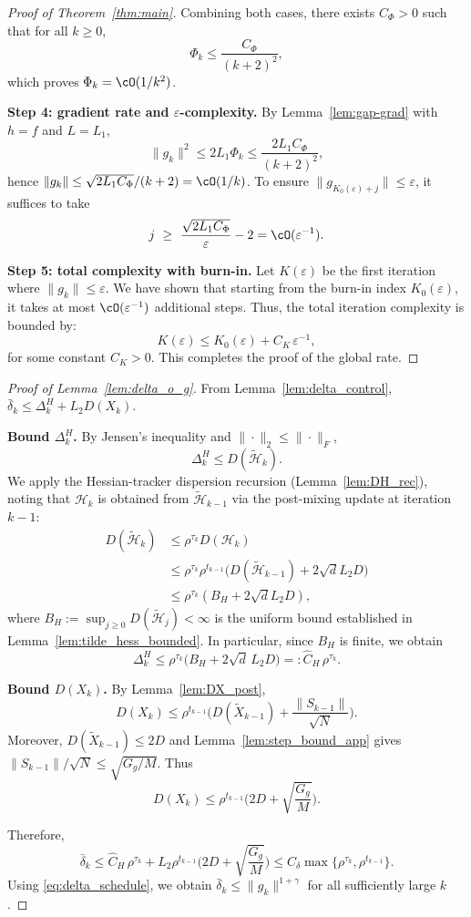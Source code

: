 \documentclass[review,onefignum,onetabnum]{siamart171218}
\begin{document}
\begin{proof}[Proof of Theorem~\ref{thm:main}]
		Combining both cases, there exists $C_\Phi>0$ such that for all $k\ge 0$,
		\[
		\Phi_k\le \frac{C_\Phi}{(k+2)^2},
		\]
		which proves $\Phi_k=\cO(1/k^2)$.
		
		\smallskip
		\noindent\textbf{Step 4: gradient rate and $\varepsilon$-complexity.}
		By Lemma~\ref{lem:gap-grad} with $h=f$ and $L=L_1$,
		\[
		\|g_k\|^2\le 2L_1\Phi_k\le \frac{2L_1 C_\Phi}{(k+2)^2},
		\]
		hence $\|g_k\|\le \sqrt{2L_1 C_\Phi}/(k+2)=\cO(1/k)$.
		To ensure $\|g_{K_0(\varepsilon)+j}\|\le \varepsilon$, it suffices to take
		\[
		j\ \ge\ \frac{\sqrt{2L_1 C_\Phi}}{\varepsilon}-2
		=\cO(\varepsilon^{-1}).
		\]
		
		\smallskip
		\noindent\textbf{Step 5: total complexity with burn-in.}
		Let $K(\varepsilon)$ be the first iteration where $\|g_k\|\le \varepsilon$. We have shown that starting from the burn-in index $K_0(\varepsilon)$, it takes at most $\cO(\varepsilon^{-1})$ additional steps. Thus, the total iteration complexity is bounded by:
		\[
		K(\varepsilon)\le K_0(\varepsilon)+C_K\,\varepsilon^{-1},
		\]
		for some constant $C_K>0$. This completes the proof of the global rate.
	\end{proof}
	
	\begin{proof}[Proof of Lemma~\ref{lem:delta_o_g}]
		From Lemma~\ref{lem:delta_control}, $\bar\delta_k\le \Delta_k^H+L_2D(X_k)$.
		
		\smallskip
		\noindent\textbf{Bound $\Delta_k^H$.}
		By Jensen's inequality and $\|\cdot\|_2\le \|\cdot\|_F$,
		\[
		\Delta_k^H\le D(\tilde{\mathcal H}_k).
		\]
		We apply the Hessian-tracker dispersion recursion (Lemma~\ref{lem:DH_rec}),
		noting that $\mathcal H_k$ is obtained from $\tilde{\mathcal H}_{k-1}$
		via the post-mixing update at iteration $k{-}1$:
		\begin{align*}
			D(\tilde{\mathcal H}_k)
			&\le \rho^{\tau_k}D(\mathcal H_k)\\
			&\le \rho^{\tau_k}\rho^{t_{k-1}}\bigl(D(\tilde{\mathcal H}_{k-1})
			\!+\!2\sqrt{d}L_2D\bigr)\\
			&\le \rho^{\tau_k}(B_H\!+\!2\sqrt{d}L_2D),
		\end{align*}
		where $B_H:=\sup_{j\ge 0}D(\tilde{\mathcal H}_j)<\infty$ is the uniform bound
		established in Lemma~\ref{lem:tilde_hess_bounded}.
		In particular, since $B_H$ is finite, we obtain
		\[
		\Delta_k^H\le \rho^{\tau_k}\big(B_H+2\sqrt{d}\,L_2D\big)
		=:\hat C_H\,\rho^{\tau_k}.
		\]
		
		\smallskip
		\noindent\textbf{Bound $D(X_k)$.}
		By Lemma~\ref{lem:DX_post},
		\[
		D(X_k)\le \rho^{t_{k-1}}\Big(D(\tilde X_{k-1})+\frac{\|S_{k-1}\|}{\sqrt N}\Big).
		\]
		Moreover, $D(\tilde X_{k-1})\le 2D$ and Lemma~\ref{lem:step_bound_app} gives $\|S_{k-1}\|/\sqrt N\le \sqrt{G_g/M}$.
		Thus
		\[
		D(X_k)\le \rho^{t_{k-1}}\Big(2D+\sqrt{\frac{G_g}{M}}\Big).
		\]
		
		\smallskip
		Therefore,
		\[
		\bar\delta_k\le \hat C_H\,\rho^{\tau_k}
		+L_2\rho^{t_{k-1}}\Big(2D+\sqrt{\frac{G_g}{M}}\Big)
		\le C_\delta\max\{\rho^{\tau_k},\rho^{t_{k-1}}\}.
		\]
		Using \eqref{eq:delta_schedule}, we obtain $\bar\delta_k\le \|g_k\|^{1+\gamma}$ for all sufficiently large $k$.
	\end{proof}
	
\end{document}
